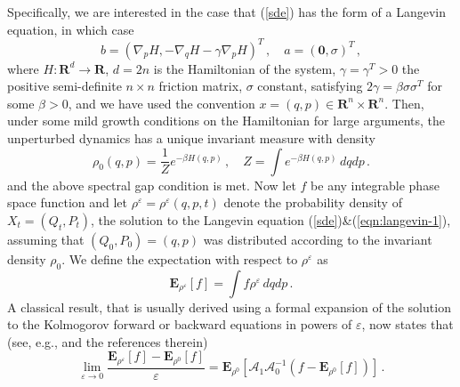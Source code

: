 \documentclass[]{tMPH2e}
\newcommand{\R}{{\mathbf R}}
\newcommand{\eps}{\varepsilon}
\newcommand{\cA}{\mathcal A}
\newcommand{\bE}{{\mathbf E}}
\newcommand{\zero}{{\mathbf 0}}
\newcommand{\wrt}{with respect to }
\begin{document}
Specifically, we are interested in the case that (\ref{sde}) has the form of a Langevin equation, in which case  
\begin{equation}\label{eqn:langevin-1}
b = \left(\nabla_{p}H, -\nabla_{q} H - \gamma\nabla_{p}H\right )^{T}\,,\quad a= (\zero,\sigma)^{T}\,,
\end{equation}
where $H\colon\R^{d}\to\R$, $d=2n$ is the Hamiltonian of the system, $\gamma=\gamma^{T}>0$ the positive semi-definite $n\times n$ friction matrix, $\sigma$ constant, satisfying $2\gamma=\beta\sigma\sigma^{T}$ for some $\beta>0$, and we have used the convention $x=(q,p)\in\R^{n}\times\R^{n}$. Then, under some mild growth conditions on the Hamiltonian for large arguments, the unperturbed dynamics has a unique invariant measure with density 
\[
\rho_{0}(q,p) = \frac{1}{Z}e^{-\beta H(q,p)}\,,\quad  Z=\int  e^{-\beta H(q,p)}\,dqdp\,.
\] 
and the above spectral gap condition is met. Now let $f$ be any integrable phase space function and let $\rho^{\eps}=\rho^{\eps}(q,p,t)$ denote the probability density of $X_t=(Q_{t},P_{t})$, the solution to the Langevin equation (\ref{sde})\&(\ref{eqn:langevin-1}), assuming that $(Q_{0},P_{0})=(q,p)$ was distributed according to the invariant density $\rho_{0}$. We define the expectation \wrt $\rho^{\eps}$ as 
\[
\bE_{\rho^{\eps}}[f] = \int f \rho^{\eps} \,dqdp\,.
\] 
A classical result, that is usually derived using a formal expansion of the solution to the Kolmogorov forward or backward equations in powers of $\eps$, now states that (see, e.g., \cite{hairer2008} and the references therein)
\begin{equation}\label{lr}
\lim_{\eps\to 0}\frac{\bE_{\rho^{\eps}}[f] - \bE_{\rho^{0}}[f]}{\eps} = \bE_{\rho^{0}}[\cA_{1}\cA_{0}^{-1}(f-\bE_{\rho^{0}}[f])]\,.
\end{equation}
\end{document}
